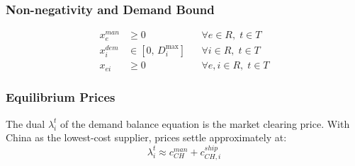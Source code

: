 \documentclass{article}
\begin{document}
\subsubsection*{Non-negativity and Demand Bound}
\begin{align}
x_e^{man} &\ge 0 && \forall e \in R,\; t \in T \\
x_i^{dem} &\in [0,\, D_i^{\max}] && \forall i \in R,\; t \in T \\
x_{ei} &\ge 0 && \forall e, i \in R,\; t \in T
\end{align}

\subsubsection*{Equilibrium Prices}
The dual $\lambda_i^t$ of the demand balance equation is the market clearing price.
With China as the lowest-cost supplier, prices settle approximately at:
\begin{equation}
\lambda_i^t \approx c_{CH}^{man} + c_{CH,i}^{ship}
\end{equation}
\end{document}
